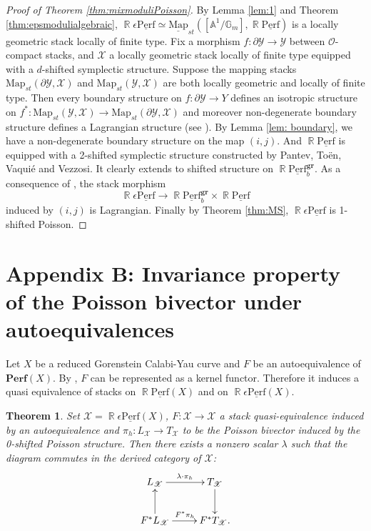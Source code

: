 \documentclass[reqno]{amsart}
\DeclareMathOperator\R{\mathbb R}
\newtheorem{theorem}{Theorem}[section]
\theoremstyle{definition}
\theoremstyle{remark}
\newcommand{\G}{{\mathbb G}}
\newcommand{\A}{{\mathbb A}}
\newcommand{\ul}{\underline}
\newcommand{\eps}{\epsilon}
\newcommand{\perf}{\mathbf{Perf}}
\newcommand{\uperf}{\ul{\mathrm{Perf}}}
\newcommand{\gr}{\mathbf{gr}}
\newcommand{\cO}{\mathcal{O}}
\newcommand{\Map}{{\mathrm{Map}}}
\newcommand{\sX}{\mathscr{X}}
\newcommand{\sY}{\mathscr{Y}}
\numberwithin{equation}{section}
\begin{document}
\begin{proof}[Proof of Theorem \ref{thm:mixmoduliPoisson}]
By Lemma \ref{lem:1} and Theorem \ref{thm:epsmodulialgebraic}, $\R\eps\uperf\simeq \ul\Map_{st}([\A^1\big/ \G_m], \R\uperf)$ is a locally geometric stack locally of finite type. Fix a morphism $f:\partial\sY\to \sY$ between $\cO$-compact stacks, and $\sX$ a locally geometric stack locally of finite type equipped with a $d$-shifted symplectic structure. Suppose the mapping stacks  $\Map_{st}(\partial \sY, \sX)$ and $\Map_{st}(\sY, \sX)$ are both locally geometric and locally of finite type. Then every boundary structure on $f:\partial \sY\to Y$ defines an isotropic structure on $f^*: \Map_{st}(\sY, \sX)\to \Map_{st}(\partial \sY, \sX)$ and moreover non-degenerate boundary structure defines a Lagrangian structure (see \cite[Theorem 2.9]{Ca14}). By Lemma \ref{lem: boundary}, we have a non-degenerate boundary structure on the map $(i,j)$. And $\R\uperf$ is equipped with a 2-shifted symplectic structure constructed by Pantev, To\"en, Vaqui\'e and Vezzosi. It clearly extends to shifted structure on $\R\uperf^\gr_b$.  As a consequence of \cite[Theorem 2.9]{Ca14}, the stack morphism
\[
\R\eps\uperf \to \R\uperf^\gr_b\times \R\uperf
\] induced by $(i,j)$ is Lagrangian. Finally by Theorem \ref{thm:MS}, $\R\eps\uperf$ is 1-shifted Poisson.

\end{proof}

\section*{Appendix B: Invariance property of the Poisson bivector under autoequivalences}
Let $X$ be a reduced Gorenstein Calabi-Yau curve and $F$ be an autoequivalence of $\perf(X)$. By \cite[Corollary 9.13]{OL10}, $F$ can be represented as a kernel functor. Therefore it induces a quasi equivalence of stacks on $\R\uperf(X)$ and on $\R\eps\uperf(X)$. 


\begin{theorem}
Set $\sX=\R\eps\uperf(X)$, $F:\sX\to \sX$ a stack quasi-equivalence induced by an autoequivalence and $\pi_h: L_\sX\to T_\sX$ to be the Poisson bivector induced by the 0-shifted Poisson structure. Then there exists a nonzero scalar $\lambda$ such that the diagram commutes in the derived category of $\sX$:
\[\xymatrix{
L_\sX\ar[r]^{\lambda\cdot \pi_h} & T_\sX\ar[d] \\
F^*L_\sX\ar[u]\ar[r]^{F^*\pi_h} & F^*T_\sX.
}\]
\end{theorem}
\end{document}
